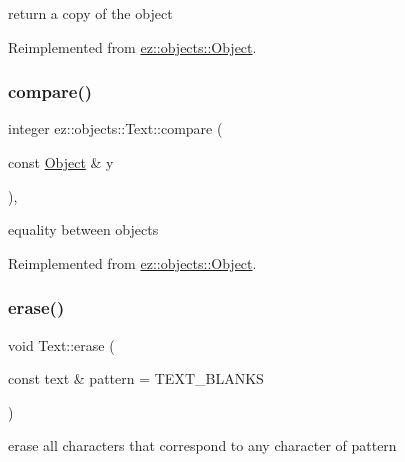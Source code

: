 return a copy of the object 

Reimplemented from \hyperlink{classez_1_1objects_1_1Object_acf444b2581d898eb4b8c92c2d5865c9e}{ez\+::objects\+::\+Object}.

\mbox{\label{classez_1_1objects_1_1Text_a05d5c20a25ced7a9ad33c997f435f226}} 
\subsubsection{\texorpdfstring{compare()}{compare()}}
{\footnotesize\ttfamily integer ez\+::objects\+::\+Text\+::compare (\begin{DoxyParamCaption}\item[{const \hyperlink{classez_1_1objects_1_1Object}{Object} \&}]{y }\end{DoxyParamCaption})\hspace{0.3cm}{\ttfamily [inline]}, {\ttfamily [virtual]}}

equality between objects 

Reimplemented from \hyperlink{classez_1_1objects_1_1Object_aca311d389dffa204e425463145f4e1e6}{ez\+::objects\+::\+Object}.

\mbox{\label{classez_1_1objects_1_1Text_aa40fc7443ff1b821b6080698560ab1f3}} 
\subsubsection{\texorpdfstring{erase()}{erase()}}
{\footnotesize\ttfamily void Text\+::erase (\begin{DoxyParamCaption}\item[{const text \&}]{pattern = {\ttfamily TEXT\+\_\+BLANKS} }\end{DoxyParamCaption})}

erase all characters that correspond to any character of pattern \mbox{\label{classez_1_1objects_1_1Text_ac93f001a43898fef37edf0daa67012ef}} 
